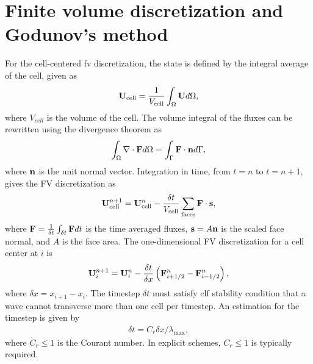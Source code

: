 \section[Finite volume discretization and Godunov's method]{Finite volume discretization and Godunov's method}
\label{sec:fvm_mhd}

For the cell-centered \gls{fv} discretization, the state is defined by the integral average of the cell, given as
\begin{gather}
\label{eqn:fv_state}
\mathbf{U}_{\text{cell}} = \frac{1}{V_{\text{cell}}} \int_{\Omega} \mathbf{U} d\Omega,
\end{gather}
where $V_{cell}$ is the volume of the cell.  The volume integral of the fluxes can be rewritten using the divergence theorem as
\begin{gather}
\label{eqn:fv_flux}
\int_{\Omega} \mathbf{\nabla} \cdot \mathbf{F} d \Omega = \int_{\Gamma} \mathbf{F} \cdot \mathbf{n} d\Gamma,
\end{gather}
where $\mathbf{n}$ is the unit normal vector.  Integration in time, from $t=n$ to $t = n+1$, gives the FV discretization as
\begin{gather}
\label{eqn:fvm}
\mathbf{U}^{n+1}_{\text{cell}} = \mathbf{U}^n_{\text{cell}} - \frac{\delta t}{V_{\text{cell}}}\sum_{\text{faces}} \mathbf{F}\cdot \mathbf{s},
\end{gather}
where $\mathbf{F} = \frac{1}{\delta t} \int_{\delta t} \mathbf{F} dt$ is the time averaged fluxes, $\mathbf{s} = A\mathbf{n}$ is the scaled face normal, and $A$ is the face area.  The one-dimensional FV discretization for a cell center at $i$ is
\begin{gather}
\label{eqn:fvm1d}
\mathbf{U}^{n+1}_{i} = \mathbf{U}^n_{i} - \frac{\delta t}{\delta x}\left(\mathbf{F}^n_{i+1/2} - \mathbf{F}_{i-1/2}^n \right),
\end{gather}
where $\delta x = x_{i+1} - x_{i}$.  The timestep $\delta t$ must satisfy \gls{clf} stability condition that a wave cannot transverse more than one cell per timestep.  An estimation for the timestep is given by
\begin{gather}
\label{time_clf}
\delta t = C_r \delta x/\lambda_{\max},
\end{gather}
where $C_r \le 1$ is the Courant number.  In explicit schemes, $C_r \le 1$ is typically required.

